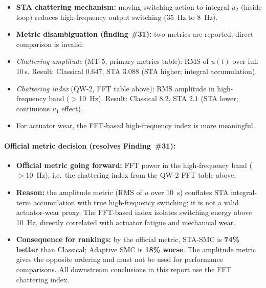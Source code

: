 \documentclass[10pt, a4paper]{article}
\begin{document}
\begin{itemize}[leftmargin=1.5em,itemsep=0.2em]
  \item \textbf{STA chattering mechanism:} moving switching action to integral
  $u_2$ (inside loop) reduces high-frequency output switching (35~Hz to 8~Hz).
  \item \textbf{Metric disambiguation (finding \#31):}
  two metrics are reported; direct comparison is invalid:
\end{itemize}
\begin{itemize}[noitemsep]
  \item \textit{Chattering amplitude} (MT-5, primary metrics table):
        RMS of $u(t)$ over full 10\,s.
        Result: Classical $0.647$, STA $3.088$ (STA higher; integral accumulation).
  \item \textit{Chattering index} (QW-2, FFT table above):
        RMS amplitude in high-frequency band ($>$10~Hz).
        Result: Classical $8.2$, STA $2.1$ (STA lower; continuous $u_1$ effect).
\end{itemize}
\begin{itemize}[leftmargin=1.5em,itemsep=0.2em]
  \item For actuator wear, the FFT-based high-frequency index is more meaningful.
\end{itemize}

\paragraph{Official metric decision (resolves Finding~\#31):}
\begin{itemize}[leftmargin=1.5em,itemsep=0.2em]
  \item \textbf{Official metric going forward:} FFT power in the high-frequency
  band ($>10$~Hz), i.e.\ the chattering index from the QW-2 FFT table above.
  \item \textbf{Reason:} the amplitude metric (RMS of $u$ over 10~s) conflates
  STA integral-term accumulation with true high-frequency switching; it is not
  a valid actuator-wear proxy.  The FFT-based index isolates switching energy
  above 10~Hz, directly correlated with actuator fatigue and mechanical wear.
  \item \textbf{Consequence for rankings:} by the official metric, STA-SMC is
  \textbf{74\% better} than Classical; Adaptive SMC is \textbf{18\% worse}.
  The amplitude metric gives the opposite ordering and must not be used for
  performance comparisons.  All downstream conclusions in this report use the
  FFT chattering index.
\end{itemize}
\end{document}
